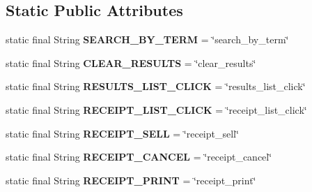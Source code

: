 \subsection*{Static Public Attributes}
\begin{DoxyCompactItemize}
\item 
\hypertarget{classw3se_1_1_controller_1_1_sell_view_controller_a5ca598c03b19822e8c8d720f13044058}{static final String {\bfseries S\-E\-A\-R\-C\-H\-\_\-\-B\-Y\-\_\-\-T\-E\-R\-M} = \char`\"{}search\-\_\-by\-\_\-term\char`\"{}}\label{classw3se_1_1_controller_1_1_sell_view_controller_a5ca598c03b19822e8c8d720f13044058}

\item 
\hypertarget{classw3se_1_1_controller_1_1_sell_view_controller_a235561f4a9678365646ca044d7b353ac}{static final String {\bfseries C\-L\-E\-A\-R\-\_\-\-R\-E\-S\-U\-L\-T\-S} = \char`\"{}clear\-\_\-results\char`\"{}}\label{classw3se_1_1_controller_1_1_sell_view_controller_a235561f4a9678365646ca044d7b353ac}

\item 
\hypertarget{classw3se_1_1_controller_1_1_sell_view_controller_afff838f51f4475368e93cb907bd9f054}{static final String {\bfseries R\-E\-S\-U\-L\-T\-S\-\_\-\-L\-I\-S\-T\-\_\-\-C\-L\-I\-C\-K} = \char`\"{}results\-\_\-list\-\_\-click\char`\"{}}\label{classw3se_1_1_controller_1_1_sell_view_controller_afff838f51f4475368e93cb907bd9f054}

\item 
\hypertarget{classw3se_1_1_controller_1_1_sell_view_controller_a81d9348466d59225aab278801b0dd06f}{static final String {\bfseries R\-E\-C\-E\-I\-P\-T\-\_\-\-L\-I\-S\-T\-\_\-\-C\-L\-I\-C\-K} = \char`\"{}receipt\-\_\-list\-\_\-click\char`\"{}}\label{classw3se_1_1_controller_1_1_sell_view_controller_a81d9348466d59225aab278801b0dd06f}

\item 
\hypertarget{classw3se_1_1_controller_1_1_sell_view_controller_a768dd75f8fa626dc6672914f5d5ed1d4}{static final String {\bfseries R\-E\-C\-E\-I\-P\-T\-\_\-\-S\-E\-L\-L} = \char`\"{}receipt\-\_\-sell\char`\"{}}\label{classw3se_1_1_controller_1_1_sell_view_controller_a768dd75f8fa626dc6672914f5d5ed1d4}

\item 
\hypertarget{classw3se_1_1_controller_1_1_sell_view_controller_aaf220d5cd30537b26f272d3a5bdcb908}{static final String {\bfseries R\-E\-C\-E\-I\-P\-T\-\_\-\-C\-A\-N\-C\-E\-L} = \char`\"{}receipt\-\_\-cancel\char`\"{}}\label{classw3se_1_1_controller_1_1_sell_view_controller_aaf220d5cd30537b26f272d3a5bdcb908}

\item 
\hypertarget{classw3se_1_1_controller_1_1_sell_view_controller_a84f1d5f7b4ef2e582f9cf58ee6a81efc}{static final String {\bfseries R\-E\-C\-E\-I\-P\-T\-\_\-\-P\-R\-I\-N\-T} = \char`\"{}receipt\-\_\-print\char`\"{}}\label{classw3se_1_1_controller_1_1_sell_view_controller_a84f1d5f7b4ef2e582f9cf58ee6a81efc}

\end{DoxyCompactItemize}
